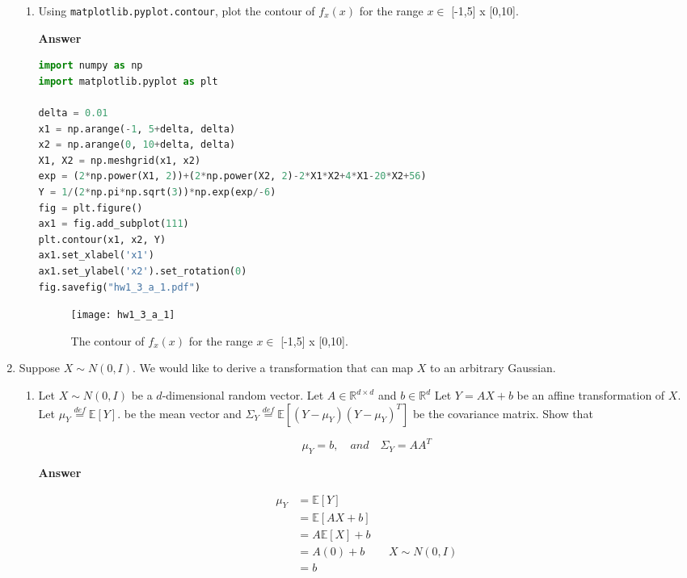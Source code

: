 \documentclass[11pt]{article}
\begin{document}
\begin{enumerate}[label=(\alph*)]
\begin{enumerate}[label=(\roman*)]
\item Using \texttt{matplotlib.pyplot.contour}, plot the contour of $f_x(x)$ for the range $x \in $ [-1,5] x [0,10].

\noindent\textbf{Answer}

\begin{lstlisting}[language=Python, showstringspaces=false]
import numpy as np
import matplotlib.pyplot as plt

delta = 0.01
x1 = np.arange(-1, 5+delta, delta)
x2 = np.arange(0, 10+delta, delta)
X1, X2 = np.meshgrid(x1, x2)
exp = (2*np.power(X1, 2))+(2*np.power(X2, 2)-2*X1*X2+4*X1-20*X2+56)
Y = 1/(2*np.pi*np.sqrt(3))*np.exp(exp/-6)
fig = plt.figure()
ax1 = fig.add_subplot(111)
plt.contour(x1, x2, Y)
ax1.set_xlabel('x1')
ax1.set_ylabel('x2').set_rotation(0)
fig.savefig("hw1_3_a_1.pdf")
\end{lstlisting}

\begin{figure}[H]
\centering
\texttt{[image: hw1\_3\_a\_1]}
\caption{The contour of $f_x(x)$ for the range $x \in $ [-1,5] x [0,10].}
\label{fig: hw1_3_a_1}
\end{figure}

\end{enumerate}

\item Suppose $X \sim N(0,I)$. We would like to derive a transformation that can map $X$ to an arbitrary Gaussian. 

\begin{enumerate}[label=(\roman*)]

\item Let $X \sim N(0,I)$ be a $d$-dimensional random vector. Let $A \in \mathbb{R}^{d \times d}$ and $b \in \mathbb{R}^d$
Let $Y = AX + b$ be an affine transformation of $X$. Let $\mu_Y \overset{def}{=} \mathbb{E}[Y]$. be the mean vector and $\Sigma_Y \overset{def}{=} \mathbb{E}[(Y-\mu_Y)(Y-\mu_Y)^T]$ be the covariance matrix. Show that

\begin{equation}
\mu_Y = b, \quad and \quad \Sigma_Y = AA^T
\end{equation}

\noindent\textbf{Answer}

\begin{align*}
\mu_Y& = \mathbb{E}[Y] \\
& = \mathbb{E}[AX+b] \\
& = A\mathbb{E}[X]+b \\
& = A(0)+b && \text{$X \sim N(0,I)$} \\
& = b
\end{align*}


\end{enumerate}
\end{enumerate}
\end{document}
